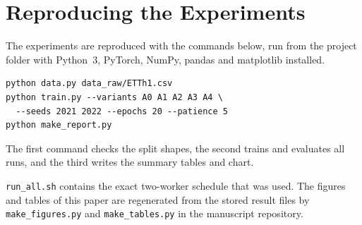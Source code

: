 \section{Reproducing the Experiments}
\label{app:repro}

The experiments are reproduced with the commands below, run from the project folder with Python~3, PyTorch, NumPy, pandas and matplotlib installed.

\begin{footnotesize}
\begin{verbatim}
python data.py data_raw/ETTh1.csv
python train.py --variants A0 A1 A2 A3 A4 \
  --seeds 2021 2022 --epochs 20 --patience 5
python make_report.py
\end{verbatim}
\end{footnotesize}

\noindent The first command checks the split shapes, the second trains and evaluates all runs, and the third writes the summary tables and chart.

\noindent \texttt{run\_all.sh} contains the exact two-worker schedule that was used. The figures and tables of this paper are regenerated from the stored result files by \texttt{make\_figures.py} and \texttt{make\_tables.py} in the manuscript repository.
